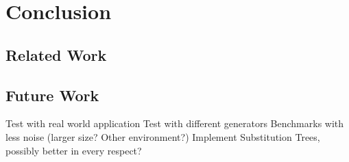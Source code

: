 \chapter{Conclusion}
\section{Related Work}

\section{Future Work}
Test with real world application
Test with different generators
Benchmarks with less noise (larger size? Other environment?)
Implement Substitution Trees, possibly better in every respect?
